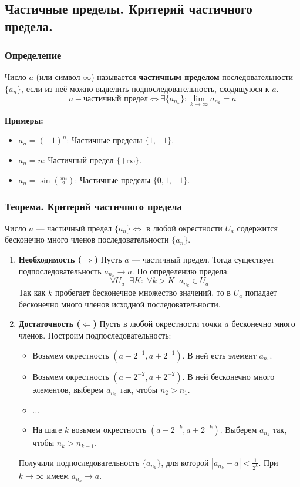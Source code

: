 \subsection{Частичные пределы. Критерий частичного предела.}

\subsubsection*{Определение}
Число $a$ (или символ $\infty$) называется \textbf{частичным пределом} последовательности $\{a_n\}$, если из неё можно выделить подпоследовательность, сходящуюся к $a$.
\[ a - \text{частичный предел} \Leftrightarrow \exists \{a_{n_k}\}: \lim_{k \to \infty} a_{n_k} = a \]

\textbf{Примеры:}
\begin{itemize}
    \item $a_n = (-1)^n$: Частичные пределы $\{1, -1\}$.
    \item $a_n = n$: Частичный предел $\{+\infty\}$.
    \item $a_n = \sin(\frac{\pi n}{2})$: Частичные пределы $\{0, 1, -1\}$.
\end{itemize}

\subsubsection*{Теорема. Критерий частичного предела}
Число $a$ — частичный предел $\{a_n\} \Leftrightarrow$ в любой окрестности $U_a$ содержится бесконечно много членов последовательности $\{a_n\}$.

\begin{tcolorbox}[title=Доказательство]
	\begin{enumerate}
		\item \textbf{Необходимость ($\Rightarrow$)}
			Пусть $a$ — частичный предел. Тогда существует подпоследовательность $a_{n_k} \to a$.
			По определению предела:
			\[ \forall U_a \;\; \exists K: \; \forall k > K \;\; a_{n_k} \in U_a \]
			Так как $k$ пробегает бесконечное множество значений, то в $U_a$ попадает бесконечно много членов исходной последовательности.

		\item \textbf{Достаточность ($\Leftarrow$)}
			Пусть в любой окрестности точки $a$ бесконечно много членов. Построим подпоследовательность:
			\begin{itemize}
			    \item Возьмем окрестность $(a - 2^{-1}, a + 2^{-1})$. В ней есть элемент $a_{n_1}$.
			    \item Возьмем окрестность $(a - 2^{-2}, a + 2^{-2})$. В ней бесконечно много элементов, выберем $a_{n_2}$ так, чтобы $n_2 > n_1$.
			    \item $\dots$
			    \item На шаге $k$ возьмем окрестность $(a - 2^{-k}, a + 2^{-k})$. Выберем $a_{n_k}$ так, чтобы $n_k > n_{k-1}$.
			\end{itemize}
			Получили подпоследовательность $\{a_{n_k}\}$, для которой $|a_{n_k} - a| < \frac{1}{2^k}$.
			При $k \to \infty$ имеем $a_{n_k} \to a$.
	\end{enumerate}
\end{tcolorbox}

